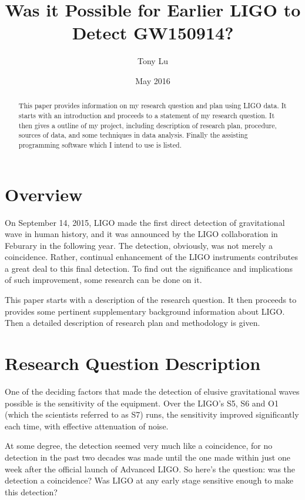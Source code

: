 \documentclass[aps,prl,preprint]{revtex4}
\begin{document}
\pagestyle{pioneer}
\date{May 2016}
\preprint{}
\title{Was it Possible for Earlier LIGO to Detect GW150914?}
\author{Tony Lu}


\begin{abstract}
This paper provides information on my research question and plan using LIGO data. It starts with an introduction and proceeds to a statement of my research question. It then gives a outline of my project, including description of research plan, procedure, sources of data, and some techniques in data analysis. Finally the assisting programming software which I intend to use is listed.
\end{abstract}

\maketitle

\section{Overview}
On September 14, 2015, LIGO made the first direct detection of gravitational wave in human history\cite{GW}, and it was announced by the LIGO collaboration in Feburary in the following year\cite{O1}. The detection, obviously, was not merely a coincidence. Rather, continual enhancement of the LIGO instruments contributes a great deal to this final detection. To find out the significance and implications of such improvement, some research can be done on it.
\par This paper starts with a description of the research question. It then proceeds to provides some pertinent supplementary background information about LIGO. Then a detailed description of research plan and methodology is given.

\section{Research Question Description}
One of the deciding factors that made the detection of elusive gravitational waves possible is the sensitivity of the equipment. Over the LIGO's S5\cite{S5}, S6\cite{S6} and O1\cite{O1} (which the scientists referred to as S7) runs, the sensitivity improved significantly each time, with effective attenuation of noise.
\par At some degree, the detection seemed very much like a coincidence, for no detection in the past two decades was made until the one made within just one week after the official launch of Advanced LIGO. So here's the question: was the detection a coincidence? Was LIGO at any early stage sensitive enough to make this detection?
\end{document}
